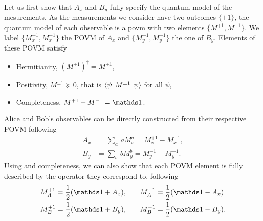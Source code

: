 Let us first show that $A_x$ and $B_y$ fully specify the quantum model of the mesurements.
As the measurements we consider have two outcomes $\{\pm1\}$, the quantum model of each observable is a \acrfull{povm} with two elements $\{M^{+1},M^{-1}\}$. We label $\{M_x^{+1},M_x^{-1}\}$ the POVM of $A_x$ and $\{M_y^{+1},M_y^{-1}\}$ the one of $B_y$.
Elements of these POVM satisfy
\begin{itemize}
	\item Hermitianity, $(M^{\pm1})^\dag=M^{\pm1}$,
	\item Positivity, $M^{\pm1} \succeq 0$, that is $\bra{\psi}M^{\pm1}\ket{\psi}$ for all $\psi$,
	\item Completeness, $M^{+1}+M^{-1}=\id$.
\end{itemize}
Alice and Bob's observables can be directly constructed from their respective POVM following
\begin{equation}
	\begin{split}
		A_x &= \sum_a \,a M^a_x = M^{+1}_x - M^{-1}_x, \\
		B_y &= \sum_b \,b M^b_y = M^{+1}_y - M^{-1}_y.
	\end{split}	
	\label{eq:obs_povm}
\end{equation}
Using  and completeness, we can also show that each POVM element is fully described by the operator they correspond to, following
\begin{equation}
	\begin{split}
		M^{+1}_A = \frac{1}{2}(\id+A_x),\qquad & M^{-1}_A = \frac{1}{2}(\id-A_x) \\
		M^{+1}_B = \frac{1}{2}(\id+B_y),\qquad & M^{-1}_B = \frac{1}{2}(\id-B_y).
	\end{split}
\end{equation}

\medbreak
	
